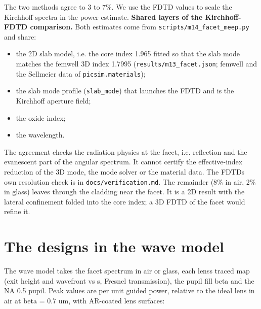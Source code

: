 The two methods agree to 3 to 7\%. We use the FDTD values to scale the
Kirchhoff spectra in the power estimate. \textbf{Shared layers of the
Kirchhoff-FDTD comparison.} Both estimates come from
\texttt{scripts/m14\_facet\_meep.py} and share:

\begin{itemize}
\tightlist
\item
  the 2D slab model, i.e. the core index 1.965 fitted so that the slab
  mode matches the femwell 3D index 1.7995
  (\texttt{results/m13\_facet.json}; femwell and the Sellmeier data of
  \texttt{picsim.materials});
\item
  the slab mode profile (\texttt{slab\_mode}) that launches the FDTD and
  is the Kirchhoff aperture field;
\item
  the oxide index;
\item
  the wavelength.
\end{itemize}

The agreement checks the radiation physics at the facet, i.e. reflection
and the evanescent part of the angular spectrum. It cannot certify the
effective-index reduction of the 3D mode, the mode solver or the
material data. The FDTD\textquotesingle s own resolution check is in
\texttt{docs/verification.md}. The remainder (8\% in air, 2\% in glass)
leaves through the cladding near the facet. It is a 2D result with the
lateral confinement folded into the core index; a 3D FDTD of the facet
would refine it.

\hypertarget{4-the-designs-in-the-wave-model}{%
\section{The designs in the wave
model}\label{collimator-4-the-designs-in-the-wave-model}}

The wave model takes the facet spectrum in air or glass, each
lens\textquotesingle s traced map (exit height and wavefront vs s,
Fresnel transmission), the pupil fill beta and the NA 0.5 pupil. Peak
values are per unit guided power, relative to the ideal lens in air at
beta = 0.7 um, with AR-coated lens surfaces:

